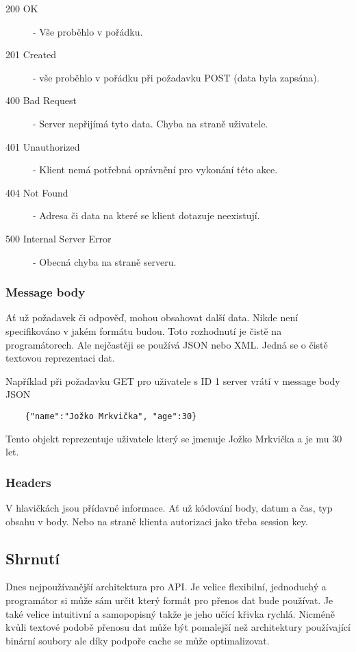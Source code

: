 \begin{description}
    \item[200 OK] - Vše proběhlo v pořádku.
    \item[201 Created] - vše proběhlo v pořádku při požadavku POST (data byla zapsána).
    \item[400 Bad Request] - Server nepřijímá tyto data. Chyba na straně uživatele.
    \item[401 Unauthorized] - Klient nemá potřebná oprávnění pro vykonání této akce.
    \item[404 Not Found] - Adresa či data na které se klient dotazuje neexistují.
    \item[500 Internal Server Error] - Obecná chyba na straně serveru.
\end{description}

\subsubsection{Message body}
Ať už požadavek či odpověď, mohou obsahovat další data. Nikde není specifikováno v jakém formátu budou. Toto rozhodnutí je čistě na programátorech. Ale nejčastěji se používá JSON nebo XML. Jedná se o čistě textovou reprezentaci dat.

Například při požadavku GET pro uživatele s ID 1 server vrátí v message body JSON
\begin{verbatim}
	{"name":"Jožko Mrkvička", "age":30}
\end{verbatim}
Tento objekt reprezentuje uživatele který se jmenuje Jožko Mrkvička a je mu 30 let.

\subsubsection{Headers}
V hlavičkách jsou přídavné informace. Ať už kódování body, datum a čas, typ obsahu v body. Nebo na straně klienta autorizaci jako třeba session key.

\subsection{Shrnutí}
Dnes nejpoužívanější architektura pro API. Je velice flexibilní, jednoduchý a programátor si může sám určit který formát pro přenos dat bude používat. Je také velice intuitivní a samopopisný takže je jeho učící křivka rychlá. Nicméně kvůli textové podobě přenosu dat může být pomalejší než architektury používající binární soubory ale díky podpoře cache se může optimalizovat.

